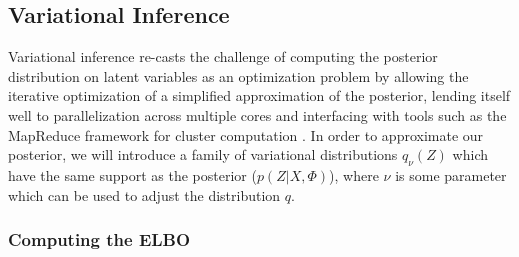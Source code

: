 \documentclass[12pt,letterpaper]{article}
\begin{document}
\subsection{Variational Inference}
Variational inference re-casts the challenge of computing the posterior distribution on latent variables as an optimization problem by allowing the iterative optimization of a simplified approximation of the posterior, lending itself well to parallelization across multiple cores and interfacing with tools such as the MapReduce framework for cluster computation \citep{zhai:2012}. In order to approximate our posterior, we will introduce a family of variational distributions $q_{\nu}(Z)$ which have the same support as the posterior ($p(Z|X, \Phi)$), where $\nu$ is some parameter which can be used to adjust the distribution $q$. 

\subsubsection{Computing the ELBO}
\end{document}
